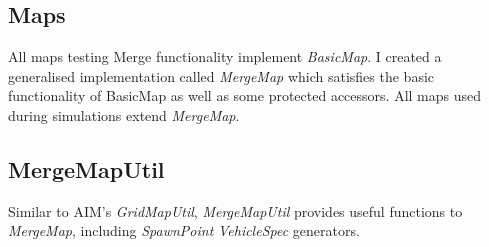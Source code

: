 \begin{appendices}
\FloatBarrier
\section{Maps}
\label{sec:Maps}
All maps testing Merge functionality implement \emph{BasicMap}. I created a generalised implementation called \emph{MergeMap} which satisfies the basic functionality of BasicMap as well as some protected accessors. All maps used during simulations extend \emph{MergeMap}.

\subsection{MergeMapUtil}
\label{sec:MergeMapUtil}
Similar to AIM's \emph{GridMapUtil}, \emph{MergeMapUtil} provides useful functions to \emph{MergeMap}, including \emph{SpawnPoint} \emph{VehicleSpec} generators.

\end{appendices}
